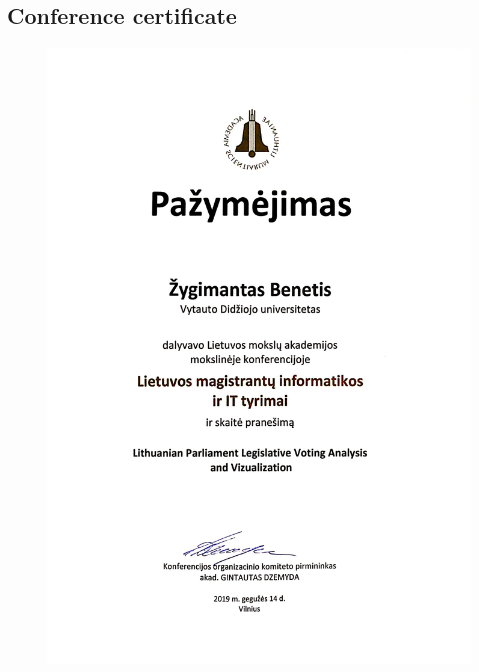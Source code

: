 \documentclass[a4paper,12pt]{article}
\begin{document}
	\clearpage
	
	\subsection{Conference certificate}
	
	\begin{figure}[H]	
		\centering
		\includegraphics[width=12.5cm]{images/conference.jpg}
		\label{fig:conference}
	\end{figure}
	
\end{document}
